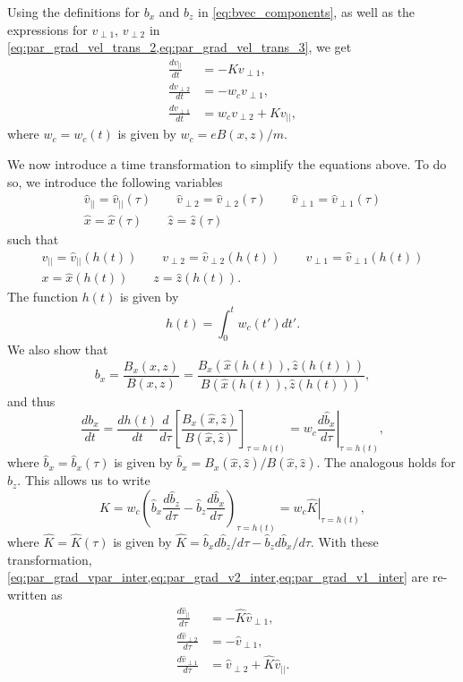 \documentclass[a4paper,11pt]{report}
\begin{document}
Using the definitions for $b_x$ and $b_z$ in \cref{eq:bvec_components}, as well as the expressions for $v_{\perp1}$, $v_{\perp2}$ in \cref{eq:par_grad_vel_trans_2,eq:par_grad_vel_trans_3}, we get
\begin{align}
    \frac{d v_{||}}{dt} &= -Kv_{\perp1}, \label{eq:par_grad_vpar_inter} \\
    \frac{dv_{\perp2}}{dt} &= -w_c v_{\perp1}, \label{eq:par_grad_v2_inter} \\
    \frac{dv_{\perp1}}{dt} &= w_c v_{\perp2} + K v_{||}, \label{eq:par_grad_v1_inter}
\end{align}
where $w_c = w_c(t)$ is given by $w_c = e B(x,z) / m$.

We now introduce a time transformation to simplify the equations above. To do so, we introduce the following variables
\begin{gather}
    \hat{v}_{||} = \hat{v}_{||}(\tau) \qquad \hat{v}_{\perp2} = \hat{v}_{\perp2}(\tau) \qquad \hat{v}_{\perp1} = \hat{v}_{\perp1}(\tau) \\
    \hat{x} = \hat{x}(\tau) \qquad \hat{z} = \hat{z}(\tau)
\end{gather}
such that
\begin{gather}
    v_{||} = \hat{v}_{||}(h(t)) \qquad v_{\perp2} = \hat{v}_{\perp2}(h(t)) \qquad v_{\perp1} = \hat{v}_{\perp1}(h(t)) \\
    x = \hat{x}(h(t)) \qquad z = \hat{z}(h(t)).
\end{gather}
The function $h(t)$ is given by
\begin{equation}
    h(t) = \int_0^t w_c(t') dt'.
\end{equation}
We also show that
\begin{equation}
    b_x = \frac{B_x(x,z)}{B(x,z)} = \frac{B_x(\hat{x}(h(t)),\hat{z}(h(t)))}{B(\hat{x}(h(t)),\hat{z}(h(t)))},
\end{equation}
and thus
\begin{equation}
    \frac{db_x}{dt} = \frac{dh(t)}{dt} \frac{d}{d\tau} \left [ \frac{B_x(\hat{x},\hat{z})}{B(\hat{x},\hat{z})} \right ]_{\tau = h(t)} = w_c \left .\frac{d \hat{b}_x}{d\tau} \right|_{\tau = h(t)},
\end{equation}
where $\hat{b}_x =\hat{b}_x(\tau)$ is given by $\hat{b}_x= B_x(\hat{x},\hat{z}) / B(\hat{x},\hat{z})$. The analogous holds for $b_z$. This allows us to write
\begin{equation}
    K = w_c \left ( \hat{b}_x \frac{d\hat{b}_z}{d \tau} - \hat{b}_z \frac{d\hat{b}_x}{d \tau} \right )_{\tau = h(t)} = w_c \left. \hat{K} \right |_{\tau = h(t)},
\end{equation}
where $\hat{K} = \hat{K}(\tau)$ is given by $\hat{K} = \hat{b}_x d\hat{b}_z/d\tau - \hat{b}_z d\hat{b}_x/d\tau$. With these transformation, \cref{eq:par_grad_vpar_inter,eq:par_grad_v2_inter,eq:par_grad_v1_inter} are re-written as
\begin{align}
    \frac{d\hat{v}_{||}}{d\tau} &= -\hat{K} \hat{v}_{\perp1},\\
    \frac{d\hat{v}_{\perp2}}{d\tau} &= -\hat{v}_{\perp1},\\
    \frac{d\hat{v}_{\perp1}}{d\tau} &= \hat{v}_{\perp2} + \hat{K} \hat{v}_{||}.
\end{align}
\end{document}
